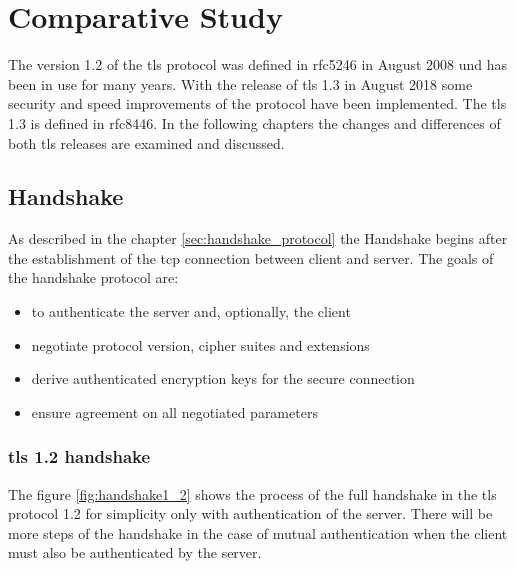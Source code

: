 \chapter{Comparative Study}
\label{chap:comparative_study}

The version 1.2 of the \gls{tls} protocol was defined in \gls{rfc}5246 in August 2008 und has been in use for many years. With the release of \gls{tls} 1.3 in August 2018 some security and speed improvements of the protocol have been implemented. The \gls{tls} 1.3 is defined in \gls{rfc}8446. In the following chapters the changes and differences of both \gls{tls} releases are examined and discussed.
\pagebreak
\section{Handshake}
\label{sec:comparison_handshake}

As described in the chapter \ref{sec:handshake_protocol} the Handshake begins after the establishment of the \gls{tcp} connection between client and server. The goals of the handshake protocol are:
\begin{itemize}
\item to authenticate the server and, optionally, the client
\item negotiate protocol version, cipher suites and extensions
\item derive authenticated encryption keys for the secure connection 
\item ensure agreement on all negotiated parameters
\end{itemize}
 \cite{Hassenstein}

\subsection{\gls{tls} 1.2 handshake}
\label{subsec:handshake1_2}

The figure \ref{fig:handshake1_2} shows the process of the full handshake in the \gls{tls} protocol 1.2 for simplicity only with authentication of the server. There will be more steps of the handshake in the case of mutual authentication when the client must also be authenticated by the server.

